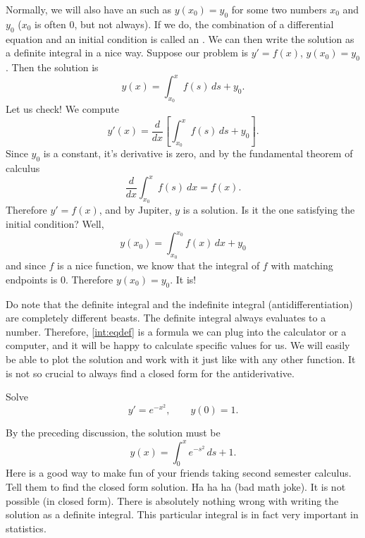 Normally, we will also have an  such as $y(x_0) = y_0$
for some two numbers $x_0$ and $y_0$ ($x_0$ is often 0, but not always). If we do, the combination of a differential equation and an initial condition is called an . We can then write the solution as a definite integral in a nice way.
Suppose our problem is $y' = f(x)$, $y(x_0) = y_0$.  Then the solution is
\begin{equation} \label{int:eqdef}
y(x) = \int_{x_0}^x f(s) \,ds + y_0 .
\end{equation}
Let us check!
We compute
\[y'(x) = \frac{d}{dx} \left[ \int_{x_0}^x f(s) \,ds + y_0 \right]. \] Since $y_0$ is a constant, it's derivative is zero, and by the fundamental theorem of calculus \[ \frac{d}{dx} \int_{x_0}^x f(s)\ dx = f(x). \] Therefore $y' = f(x)$, and by Jupiter, $y$ is a
solution.  Is it the one satisfying the initial condition?  Well,
\[y(x_0) = \int_{x_0}^{x_0} f(x)\,dx + y_0\] and since $f$ is a nice function, we know that the integral of $f$ with matching endpoints is $0$. Therefore $y(x_0) = y_0$.  It is!

Do note that the definite integral and the indefinite integral
(antidifferentiation) are completely different beasts.  The definite integral
always evaluates to a number.  Therefore, \eqref{int:eqdef} is a formula we
can plug into the calculator or a computer, and it will be happy to calculate
specific values for us.  We will easily be able to plot the
solution and work with it just like with any other function.
It is not so crucial to always find a
closed form for the antiderivative.

\begin{example}
Solve
\begin{equation*}
y' = e^{-x^2}, \qquad y(0) = 1 .
\end{equation*}
\end{example}

\begin{exampleSol}
By the preceding discussion, the solution must be
\begin{equation*}
y(x) = \int_0^x e^{-s^2} \,ds + 1 .
\end{equation*}
Here is a good way to make fun of your friends taking second semester
calculus.  Tell them to
find the closed form solution.  Ha ha ha (bad math joke).  It is
not possible (in closed form).
There is absolutely nothing wrong with writing the solution as a
definite integral. 
This particular integral
is in fact very important
in statistics.
\end{exampleSol}

